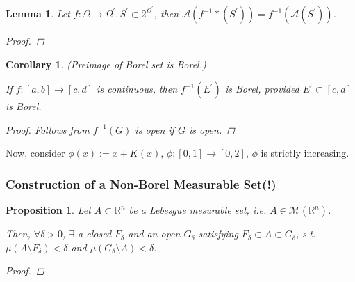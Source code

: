 \documentclass[12pt]{article}
\theoremstyle{blueplain}
\newtheorem{proposition}[theorem]{Proposition}
\newtheorem{corollary}[theorem]{Corollary}
\newtheorem{lemma}[theorem]{Lemma}
\theoremstyle{bluedef}
\theoremstyle{blueremark}
\newcommand{\R}{\mathbb{R}}
\numberwithin{equation}{section}
\begin{document}
\begin{lemma}
  Let $f: \Omega \rightarrow \Omega^{\prime}, S^{\prime} \subset 2^{\Omega^{\prime}}$, then $\mathcal{A}(f^{-1}*(S^{\prime})) = f^{-1}(\mathcal{A}(S^{\prime}))$.
  \begin{proof}

  \end{proof}
\end{lemma}

\begin{corollary}
  (Preimage of Borel set is Borel.)

  If $f: [a,b] \rightarrow [c,d]$ is continuous, then $f^{-1}(E^{\prime})$ is Borel, provided $E^{\prime} \subset [c,d]$ is Borel.
  \begin{proof}
    Follows from $f^{-1}(G)$ is open if $G$ is open.
  \end{proof}
\end{corollary}


Now, consider $\phi (x) := x + K(x)$, $\phi : [0,1] \rightarrow [0,2]$, $\phi$ is strictly increasing.












\subsubsection{Construction of a Non-Borel Measurable Set(!)}
















\clearpage


\begin{proposition}
  Let $A \subset \R^n$ be a Lebesgue mesurable set, i.e. $A \in \mathcal{M}(\R^n)$.

  Then, $\forall \delta > 0$, $\exists$ a closed $F_\delta$ and an open $G_\delta$ satisfying $F_\delta \subset A \subset G_\delta$, s.t. $\mu(A \setminus F_\delta) < \delta$ and $\mu(G_\delta \setminus A) < \delta$.
  \begin{proof}

  \end{proof}
\end{proposition}
\end{document}
